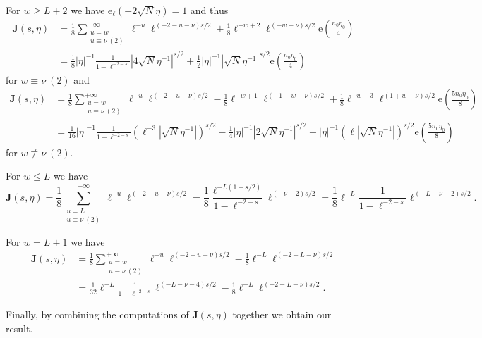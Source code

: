 \documentclass[10pt,oneside,reqno]{amsart}
\makeatletter
\newcommand\rme{\mathrm{e}}
\newcommand\bJ{\mathbf{J}}
\renewcommand\leq{\leqslant}
\renewcommand\geq{\geqslant}
\newcommand\legendresymbol[2]{\genfrac{(}{)}{}{}{#1}{#2}}
\theoremstyle{THEOREM}
\theoremstyle{DEFINITION}
\theoremstyle{EXERCISE}
\numberwithin{equation}{section}
\renewenvironment{proof}[1][\proofname]{\par
  \vspace{-6pt}
  \pushQED{\qed}
  \normalfont \topsep6\p@\@plus6\p@\relax
  \trivlist
  \item[\hskip\labelsep\rmfamily\bfseries
    #1\@addpunct{:}]\ignorespaces
}{
  \popQED\endtrivlist\@endpefalse
  \vspace{-6pt}
}
\makeatother
\begin{document}
\begin{proof}
For $w\geq L+2$ we have $\rme_\ell(-2\sqrt{N}\eta)=1$ and thus
\begin{align*}
\bJ(s,\eta)&=\frac{1}{8}\sum_{\substack{u=w\\u\equiv \nu \ (2)}}^{+\infty}\ell^{-u}\ell^{(-2-u-\nu)s/2}+ \frac{1}{8}\ell^{-w+2}\ell^{(-w-\nu)s/2}\rme\left(\frac{n_0\eta_0}{4}\right)\\
&=\frac{1}{8}|\eta|^{-1}\frac{1}{1-\ell^{-2-s}}|4\sqrt{N}\eta^{-1}|^{s/2}+\frac12|\eta|^{-1} |\sqrt{N}\eta^{-1}|^{s/2}\rme\left(\frac{n_0\eta_0}{4}\right)
\end{align*}
for $w\equiv \nu\ (2)$ and
\begin{align*}
\bJ(s,\eta)&=\frac{1}{8}\sum_{\substack{u=w\\u\equiv \nu \ (2)}}^{+\infty}\ell^{-u}\ell^{(-2-u-\nu)s/2}-\frac18 \ell^{-w+1}\ell^{(-1-w-\nu)s/2}+ \frac{1}{8}\ell^{-w+3}\ell^{(1+w-\nu)s/2}\rme\legendresymbol{5n_0\eta_0}{8}\\
&=\frac{1}{16}|\eta|^{-1}\frac{1}{1-\ell^{-2-s}}(\ell^{-3}|\sqrt{N}\eta^{-1}|)^{s/2}- \frac{1}{4}|\eta|^{-1}|2\sqrt{N}\eta^{-1}|^{s/2}+ |\eta|^{-1}(\ell|\sqrt{N}\eta^{-1}|)^{s/2}\rme\legendresymbol{5n_0\eta_0}{8}
\end{align*}
for $w\not\equiv \nu\ (2)$. 

For $w\leq L$ we have
\[
\bJ(s,\eta)=\frac{1}{8}\sum_{\substack{u=L\\u\equiv \nu \ (2)}}^{+\infty}\ell^{-u}\ell^{(-2-u-\nu)s/2}= \frac{1}{8}\frac{\ell^{-L(1+s/2)}}{1-\ell^{-2-s}}\ell^{(-\nu-2)s/2}= \frac{1}{8}\ell^{-L}\frac{1}{1-\ell^{-2-s}}\ell^{(-L-\nu-2)s/2}.
\]

For $w=L+1$ we have
\begin{align*}
\bJ(s,\eta)&=\frac{1}{8}\sum_{\substack{u=w\\u\equiv \nu \ (2)}}^{+\infty}\ell^{-u}\ell^{(-2-u-\nu)s/2}-\frac18 \ell^{-L}\ell^{(-2-L-\nu)s/2}\\
&=\frac{1}{32}\ell^{-L}\frac{1}{1-\ell^{-2-s}}\ell^{(-L-\nu-4)s/2}-\frac18 \ell^{-L}\ell^{(-2-L-\nu)s/2}.
\end{align*}

Finally, by combining the computations of $\bJ(s,\eta)$ together we obtain our result.
\end{proof}
\end{document}
